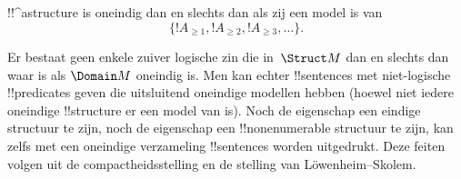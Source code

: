 \documentclass[../../../include/open-logic-section]{subfiles}
\begin{document}
\begin{prop}
!!^a{structure} is oneindig dan en slechts dan als zij een model is van
\[
\{!A_{\ge 1}, !A_{\ge 2}, !A_{\ge 3}, \dots \}.
\]
\end{prop}

Er bestaat geen enkele zuiver logische zin die in~$\Struct M$ dan en
slechts dan waar is als $\Domain M$ oneindig is. Men kan echter
!!{sentence}s met niet-logische !!{predicate}s geven die uitsluitend
oneindige modellen hebben (hoewel niet iedere oneindige !!{structure}
er een model van is). Noch de eigenschap een eindige structuur te zijn,
noch de eigenschap een !!{nonenumerable} structuur te zijn, kan zelfs
met een oneindige verzameling !!{sentence}s worden uitgedrukt. Deze
feiten volgen uit de compactheidsstelling en de stelling van
L\"owenheim--Skolem.
\end{document}
